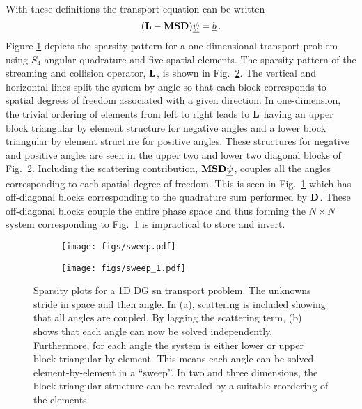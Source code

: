 \documentclass[../doc.tex]{subfiles}
\begin{document}
With these definitions the transport equation can be written 
	\begin{equation}
		(\boldsymbol{\mathrm{L}} - \boldsymbol{\mathrm{M}}\boldsymbol{\mathrm{S}}\boldsymbol{\mathrm{D}})\underline{\psi} = \underline{b} \,. 
	\end{equation}
Figure \ref{sn:discrete_full} depicts the sparsity pattern for a one-dimensional transport problem using $S_4$ angular quadrature and five spatial elements. The sparsity pattern of the streaming and collision operator, $\boldsymbol{\mathrm{L}}$, is shown in Fig.~\ref{sn:discrete_lag}. The vertical and horizontal lines split the system by angle so that each block corresponds to spatial degrees of freedom associated with a given direction. 
In one-dimension, the trivial ordering of elements from left to right leads to $\boldsymbol{\mathrm{L}}$ having an upper block triangular by element structure for negative angles and a lower block triangular by element structure for positive angles. These structures for negative and positive angles are seen in the upper two and lower two diagonal blocks of Fig.~\ref{sn:discrete_lag}. Including the scattering contribution, $\boldsymbol{\mathrm{M}}\boldsymbol{\mathrm{S}}\boldsymbol{\mathrm{D}}\underline{\psi}$, couples all the angles corresponding to each spatial degree of freedom. This is seen in Fig.~\ref{sn:discrete_full} which has off-diagonal blocks corresponding to the quadrature sum performed by $\boldsymbol{\mathrm{D}}$. These off-diagonal blocks couple the entire phase space and thus forming the $N\times N$ system corresponding to Fig.~\ref{sn:discrete_full} is impractical to store and invert. 
\begin{figure}
\centering
\begin{subfigure}{.49\textwidth}
	\centering
	\texttt{[image: figs/sweep.pdf]}
	\caption{}
	\label{sn:discrete_full}
\end{subfigure}
\begin{subfigure}{.49\textwidth}
	\centering
	\texttt{[image: figs/sweep\_1.pdf]}
	\caption{}
	\label{sn:discrete_lag}
\end{subfigure}
\caption{Sparsity plots for a 1D DG \gls{sn} transport problem. The unknowns stride in space and then angle. In (a), scattering is included showing that all angles are coupled. By lagging the scattering term, (b) shows that each angle can now be solved independently. Furthermore, for each angle the system is either lower or upper block triangular by element. This means each angle can be solved element-by-element in a ``sweep''. In two and three dimensions, the block triangular structure can be revealed by a suitable reordering of the elements.}
\label{sn:sweep}
\end{figure}
\end{document}
